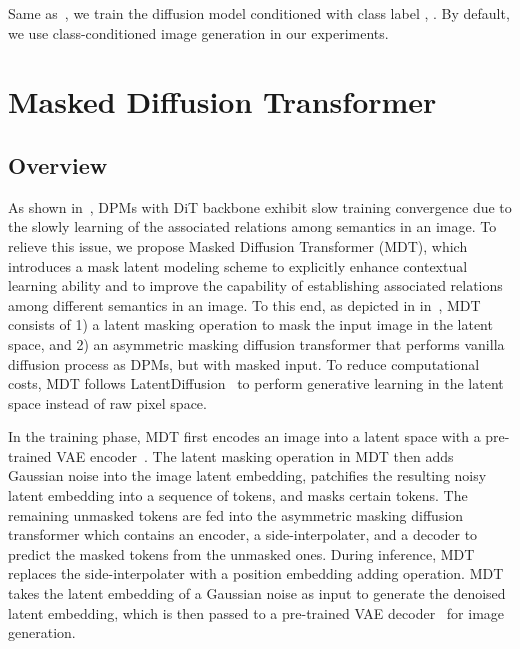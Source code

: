 \documentclass[final]{cvpr}
\begin{document}
Same as~\cite{nichol2021improved,peebles2022scalable},
we train the diffusion model conditioned with class label ,
\ie .
By default, we use class-conditioned image generation in our experiments.





\section{Masked Diffusion Transformer}
\subsection{Overview}
\label{sec:mdt_method}
 As shown in~, DPMs with DiT backbone exhibit slow 
 training convergence due to the slowly
 learning of the associated relations among semantics in an image. 
 To relieve this issue,  we  propose Masked Diffusion Transformer (MDT), which introduces  a mask latent modeling scheme to explicitly enhance contextual learning ability
 and to improve the capability of establishing associated relations among different semantics in an image.  
 To this end, as depicted in   in~, 
 MDT consists of 1) a latent masking operation to mask the input image in the latent space,  
 and 2) an asymmetric masking diffusion transformer that performs vanilla diffusion process as DPMs, but with masked input.  
 To reduce computational costs,  
 MDT follows LatentDiffusion~\cite{rombach2022high} to perform generative learning in the latent space instead of raw pixel space.  
 
In the training phase, MDT first encodes an image into a latent space with a pre-trained VAE encoder~\cite{rombach2022high}. 
The latent masking operation in MDT then adds Gaussian noise into the image latent embedding, 
patchifies the resulting noisy latent embedding into a sequence of tokens, 
and masks certain tokens. 
The remaining unmasked tokens are fed into the asymmetric masking diffusion transformer which contains an encoder, a side-interpolater, 
and a decoder to predict the masked tokens from the unmasked ones.  
During inference, MDT replaces the side-interpolater with a position embedding adding operation.
MDT takes the latent embedding of a Gaussian noise as input to generate the denoised latent embedding, which is then passed to a pre-trained VAE decoder~\cite{rombach2022high} for image generation. 
\end{document}
